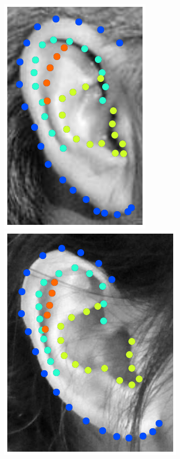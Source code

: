 \begin{figure}[!b]
    \includegraphics[height=\flowhhh]{resources/Ear_Deformable_Model/dbs/db_10}
    \hfill
    \includegraphics[height=\flowhhh]{resources/Ear_Deformable_Model/dbs/db_11}
    \hfill

\end{figure}
